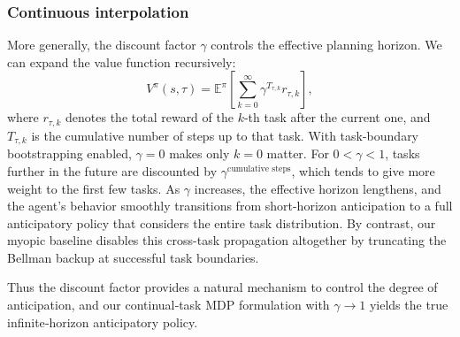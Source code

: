 \documentclass[10pt]{article} %
\begin{document}
\subsubsection*{Continuous interpolation}
More generally, the discount factor $\gamma$ controls the effective planning horizon.  
We can expand the value function recursively:
\[
V^{\pi}(s,\tau) = \mathbb{E}^{\pi}\!\left[ \sum_{k=0}^{\infty} \gamma^{T_{\tau,k}} r_{\tau,k} \right],
\]
where $r_{\tau,k}$ denotes the total reward of the $k$-th task after the current one, and $T_{\tau,k}$ is the cumulative number of steps up to that task.  
With task-boundary bootstrapping enabled, $\gamma=0$ makes only $k=0$ matter.  
For $0<\gamma<1$, tasks further in the future are discounted by $\gamma^{\text{cumulative steps}}$, which tends to give more weight to the first few tasks.  
As $\gamma$ increases, the effective horizon lengthens, and the agent’s behavior smoothly transitions from short-horizon anticipation to a full anticipatory policy that considers the entire task distribution. By contrast, our myopic baseline disables this cross-task propagation altogether by truncating the Bellman backup at successful task boundaries.

Thus the discount factor provides a natural mechanism to control the degree of anticipation, and our continual‑task MDP formulation with $\gamma \to 1$ yields the true infinite‑horizon anticipatory policy.

\end{document}

